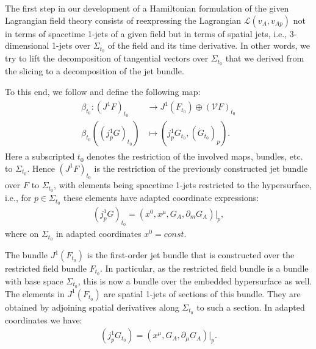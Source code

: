 The first step in our development of a Hamiltonian formulation of the given Lagrangian field theory consists of reexpressing the Lagrangian $\mathcal{L}(v_A,v_{Ap})$ not in terms of spacetime 1-jets of a given field but in terms of spatial jets, i.e., 3-dimensional 1-jets over $\Sigma_{t_0}$ of the field and its time derivative.
In other words, we try to lift the decomposition of tangential vectors over $\Sigma_{t_0}$ that we derived from the slicing to a decomposition of the jet bundle. 

To this end, we follow \cite{2004math.ph..11032G} and define the following map:
\begin{align}
    \begin{aligned}
    \beta_{t_0} : (J^1F)_{t_0} &\longrightarrow J^1(F_{t_0}) \oplus (\mathcal{V}F)_{t_0} \\
    \beta_{t_0}((j^1_pG)_{t_0}) &\longmapsto (j^1_pG_{t_0}, (\dot{G}_{t_0})_p).
    \end{aligned}
\end{align}
Here a subscripted $t_0$ denotes the restriction of the involved maps, bundles, etc. to $\Sigma_{t_0}$. Hence $(J^1F)_{t_0}$ is the restriction of the previously constructed jet bundle over $F$ to $\Sigma_{t_0}$, with elements being spacetime 1-jets restricted to the hypersurface, i.e., for $p \in \Sigma_{t_0}$ these elements have adapted coordinate expressions: 
\begin{align}
(j^1_pG)_{t_0} = (x^0,x^{\mu},G_A,\partial_m G_A) \big \vert_p,
\end{align}
where on $\Sigma_{t_0}$ in adapted coordinates $x^0=const$. 

The bundle $J^1(F_{t_0})$ is the first-order jet bundle that is constructed over the restricted field bundle $F_{t_0}$. In particular, as the restricted field bundle is a bundle with base space $\Sigma_{t_0}$, this is now a bundle over the embedded hypersurface as well. The elements in $J^1(F_{t_0})$ are spatial 1-jets of sections of this bundle. They are obtained by adjoining spatial derivatives along $\Sigma_{t_0}$ to such a section. In adapted coordinates we have: 
\begin{align}
(j^1_pG_{t_0}) = (x^{\mu},G_A,\partial_{\mu} G_A) \big \vert_p.
\end{align}

